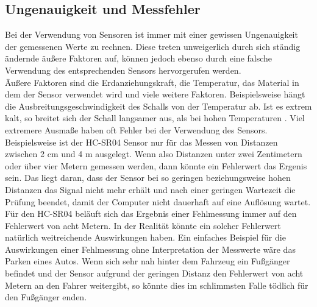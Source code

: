 \subsection{Ungenauigkeit und Messfehler}
\label{subsec:ungenauigkeit_und_messfehler}
Bei der Verwendung von Sensoren ist immer mit einer gewissen Ungenauigkeit der gemessenen Werte zu rechnen. Diese treten unweigerlich durch sich ständig ändernde äußere Faktoren auf, können jedoch ebenso durch eine falsche Verwendung des entsprechenden Sensors hervorgerufen werden.\\
Äußere Faktoren sind die Erdanziehungskraft, die Temperatur, das Material in dem der Sensor verwendet wird und viele weitere Faktoren. Beispielsweise hängt die Ausbreitungsgeschwindigkeit des Schalls von der Temperatur ab. Ist es extrem kalt, so breitet sich der Schall langsamer aus, als bei hohen Temperaturen \protect{}.
Viel extremere Ausmaße haben oft Fehler bei der Verwendung des Sensors. Beispielsweise ist der HC-SR04 Sensor nur für das Messen von Distanzen zwischen 2 cm und 4 m ausgelegt. Wenn also Distanzen unter zwei Zentimetern oder über vier Metern gemessen werden, dann könnte ein Fehlerwert das Ergenis sein. Das liegt daran, dass der Sensor bei so geringen beziehungsweise hohen Distanzen das Signal nicht mehr erhält und nach einer geringen Wartezeit die Prüfung beendet, damit der Computer nicht dauerhaft auf eine Auflösung wartet. Für den HC-SR04 beläuft sich das Ergebnis einer Fehlmessung immer auf den Fehlerwert von acht Metern. In der Realität könnte ein solcher Fehlerwert natürlich weitreichende Auswirkungen haben. Ein einfaches Beispiel für die Auswirkungen einer Fehlmessung ohne Interpretation der Messwerte wäre das Parken eines Autos. Wenn sich sehr nah hinter dem Fahrzeug ein Fußgänger befindet und der Sensor aufgrund der geringen Distanz den Fehlerwert von acht Metern an den Fahrer weitergibt, so könnte dies im schlimmsten Falle tödlich für den Fußgänger enden.\\


